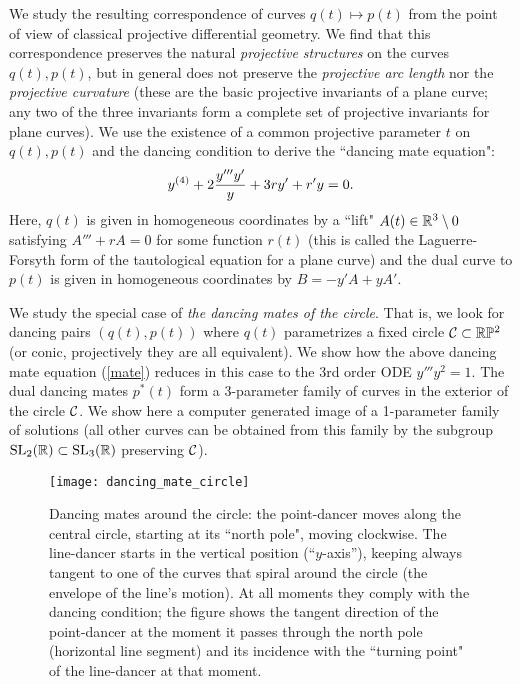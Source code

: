 We study the resulting correspondence of curves $q(t)\mapsto p(t)$ from the point of view of classical projective differential geometry. We find that this correspondence preserves the natural {\em projective structures} on the curves $q(t),p(t)$,  but in general does not preserve the {\em projective arc length} nor the {\em projective curvature} (these are the basic projective invariants of a plane curve; any two of the  three invariants form a complete set of projective  invariants for  plane curves). We use the existence of a common projective parameter $t$ on $q(t),p(t)$ and the dancing condition to derive the  ``dancing mate equation":
\begin{equation}\label{mate}
y^{(4)}+2{y'''y'\over y}+3ry'+r'y=0.\end{equation}
Here,  $q(t)$ is given in homogeneous coordinates by a ``lift" $A(t)\in\mathbb{R}^3\setminus 0$ satisfying $A'''+rA=0$ for some function $r(t)$  (this is called the Laguerre-Forsyth form of the tautological equation for a plane curve) and the dual curve to $p(t)$ is given in homogeneous coordinates by $B=-y'A+yA'$. 

We study the special case  of  {\em the dancing mates of the circle}. That is, we look for dancing pairs $(q(t), p(t))$ where $q(t)$ parametrizes a fixed  circle $\mathcal{C}\subset \mathbb{R}\mathbb{P}^2$ (or conic, projectively they are all equivalent). We show how the  above dancing mate equation  (\ref{mate}) reduces in this case to the 3rd order ODE $y'''y^2=1$. The dual dancing mates  $p^*(t)$ form a 3-parameter family of curves in the exterior of the circle $\mathcal{C}$. We show here a computer generated image of a 1-parameter family of solutions (all other curves can be obtained from this family by the subgroup  ${\mathrm{SL}_2(\mathbb{R})}\subset{\mathrm{SL}_3(\mathbb{R})}$ preserving $\mathcal{C}$).
%
\begin{figure}[h]\centering
\texttt{[image: dancing\_mate\_circle]}
\caption{Dancing mates around  the circle: the point-dancer moves along  the central circle, starting at its ``north pole", moving clockwise. 
The line-dancer starts in the vertical position (``$y$-axis''), keeping always tangent to one of the curves that spiral around the circle (the envelope of the line's motion). At all moments they  comply with the dancing condition; the figure shows the tangent direction of the point-dancer at the moment it passes through the north pole (horizontal line segment)  and its incidence  with the ``turning point" of the line-dancer at that moment.}\label{circ}
\end{figure}
%

